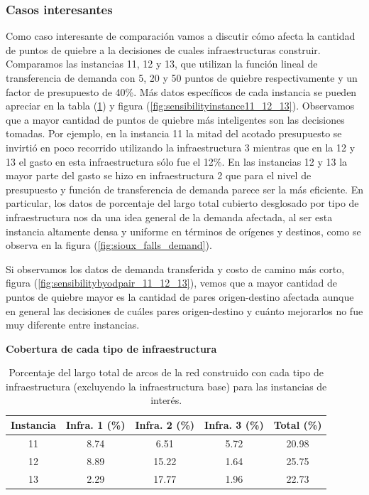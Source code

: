 \documentclass{article}
\begin{document}
  \FloatBarrier
  \subsubsection*{Casos interesantes}

  Como caso interesante de comparación vamos a discutir cómo afecta la cantidad de puntos de quiebre a la decisiones de cuales infraestructuras construir. Comparamos las instancias 11, 12 y 13, que utilizan la función lineal de transferencia de demanda con 5, 20 y 50 puntos de quiebre respectivamente y un factor de presupuesto de 40\%. Más datos específicos de cada instancia se pueden apreciar en la tabla (\ref{table:sensibilityinfralengths}) y figura (\ref{fig:sensibilityinstance11_12_13}). Observamos que a mayor cantidad de puntos de quiebre más inteligentes son las decisiones tomadas. Por ejemplo, en la instancia 11 la mitad del acotado presupuesto se invirtió en poco recorrido utilizando la infraestructura 3 mientras que en la 12 y 13 el gasto en esta infraestructura sólo fue el 12\%. En las instancias 12 y 13 la mayor parte del gasto se hizo en infraestructura 2 que para el nivel de presupuesto y función de transferencia de demanda parece ser la más eficiente. En particular, los datos de porcentaje del largo total cubierto desglosado por tipo de infraestructura nos da una idea general de la demanda afectada, al ser esta instancia altamente densa y uniforme en términos de orígenes y destinos, como se observa en la figura (\ref{fig:sioux_falls_demand}).

  Si observamos los datos de demanda transferida y costo de camino más corto, figura (\ref{fig:sensibilitybyodpair_11_12_13}), vemos que a mayor cantidad de puntos de quiebre mayor es la cantidad de pares origen-destino afectada aunque en general las decisiones de cuáles pares origen-destino y cuánto mejorarlos no fue muy diferente entre instancias.

  \begin{table}[h!]
    \centering
    \caption*{{\bf Cobertura de cada tipo de infraestructura}}
    \begin{tabular}{ccccc}
      \toprule
        Instancia & Infra. 1 (\%) & Infra. 2 (\%) & Infra. 3 (\%) & Total (\%) \\
      \midrule
        11 & 8.74  & 6.51   & 5.72 & 20.98 \\
        12 & 8.89  & 15.22  & 1.64 & 25.75 \\
        13 & 2.29  & 17.77  & 1.96 & 22.73 \\
      \bottomrule
    \end{tabular}
    \caption{Porcentaje del largo total de arcos de la red construido con cada tipo de infraestructura (excluyendo la infraestructura base) para las instancias de interés.}\label{table:sensibilityinfralengths}
  \end{table}
\end{document}
